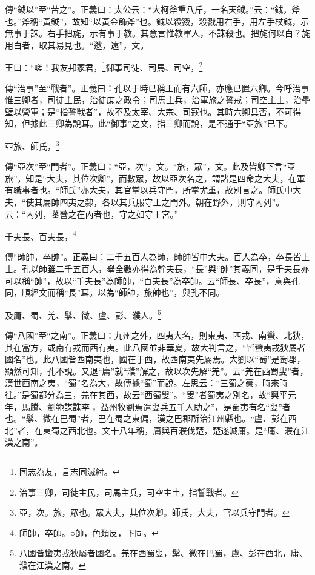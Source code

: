 {\noindent\zhuan{}\fzbyks 傳“鉞以”至“苦之”。正義曰：太公云：“大柯斧重八斤，一名天鉞。”云：“鉞，斧也。”斧稱“黃鉞”，故知“以黃金飾斧”也。鉞以殺戮，殺戮用右手，用左手杖鉞，示無事于誅。右手把旄，示有事于教。其意言惟教軍人，不誅殺也。把旄何以白？旄用白者，取其易見也。“逖，遠”，文。 \par}

王曰：“嗟！我友邦冢君，\footnote{同志為友，言志同滅紂。}御事司徒、司馬、司空，\footnote{治事三卿，司徒主民，司馬主兵，司空主土，指誓戰者。}

{\noindent\zhuan{}\fzbyks 傳“治事”至“戰者”。正義曰：孔以于時已稱王而有六師，亦應已置六卿。今呼治事惟三卿者，司徒主民，治徒庶之政令；司馬主兵，治軍旅之誓戒；司空主土，治壘壁以營軍；是“指誓戰者”，故不及太宰、大宗、司寇也。其時六卿具否，不可得知，但據此三卿為說耳。此“御事”之文，指三卿而說，是不通于“亞旅”已下。 \par}

亞旅、師氏，\footnote{亞，次。旅，眾也。眾大夫，其位次卿。師氏，大夫，官以兵守門者。}

{\noindent\zhuan{}\fzbyks 傳“亞次”至“門者”。正義曰：“亞，次”，文。“旅，眾”，文。此及皆卿下言“亞旅”，知是“大夫，其位次卿”，而數眾，故以亞次名之，謂諸是四命之大夫，在軍有職事者也。“師氏”亦大夫，其官掌以兵守門，所掌尤重，故別言之。師氏中大夫，“使其屬帥四夷之隸，各以其兵服守王之門外。朝在野外，則守內列”。云：“內列，蕃營之在內者也，守之如守王宮。” \par}

千夫長、百夫長，\footnote{師帥，卒帥。○帥，色類反，下同。}

{\noindent\zhuan{}\fzbyks 傳“師帥，卒帥”。正義曰：二千五百人為師，師帥皆中大夫。百人為卒，卒長皆上士。孔以師雖二千五百人，舉全數亦得為幹夫長，“長”與“帥”其義同，是千夫長亦可以稱“帥”，故以“千夫長”為師帥，“百夫長”為卒帥。云“師長、卒長”，意與孔同，順經文而稱“長”耳。以為“師帥，旅帥也”，與孔不同。 \par}

及庸、蜀、羌、髳、微、盧、彭、濮人。\footnote{八國皆蠻夷戎狄屬者國名。羌在西蜀叟，髳、微在巴蜀，盧、彭在西北，庸、濮在江漢之南。}

{\noindent\zhuan{}\fzbyks 傳“八國”至“之南”。正義曰：九州之外，四夷大名，則東夷、西戎、南蠻、北狄，其在當方，或南有戎而西有夷。此八國並非華夏，故大判言之，“皆蠻夷戎狄屬者國名”也。此八國皆西南夷也，國在于西，故西南夷先屬焉。大劉以“蜀”是蜀郡，顯然可知，孔不說。又退“庸”就“濮”解之，故以次先解“羌”。云“羌在西蜀叟”者，漢世西南之夷，“蜀”名為大，故傳據“蜀”而說。左思云：“三蜀之豪，時來時往。”是蜀都分為三，羌在其西，故云“西蜀叟”。“叟”者蜀夷之別名，故“興平元年，馬騰、劉範謀誅李𠐶，益州牧劉焉遣叟兵五千人助之”，是蜀夷有名“叟”者也。“髳、微在巴蜀”者，巴在蜀之東偏，漢之巴郡所治江州縣也。“盧、彭在西北”者，在東蜀之西北也。文十八年稱，庸與百濮伐楚，楚遂滅庸。是“庸、濮在江漢之南”。 \par}

